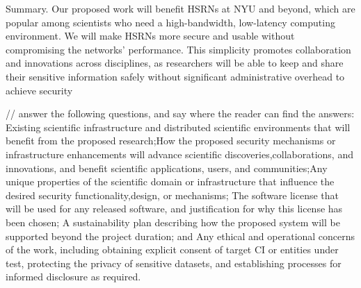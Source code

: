 Summary. Our proposed work will benefit HSRNs at NYU and beyond, which are popular among scientists who need a high-bandwidth, low-latency computing environment. We will make HSRNs more secure and usable without compromising the networks’ performance. This simplicity promotes collaboration and innovations across disciplines, as researchers will be able to keep and share their sensitive information safely without significant administrative overhead to achieve security

// answer the following questions, and say where the reader can find the answers: Existing scientific infrastructure and distributed scientific environments that will benefit from the proposed research;How the proposed security mechanisms or infrastructure enhancements will advance scientific discoveries,collaborations, and innovations, and benefit scientific applications, users, and communities;Any unique properties of the scientific domain or infrastructure that influence the desired security functionality,design, or mechanisms; The software license that will be used for any released software, and justification for why this license has been chosen; A sustainability plan describing how the proposed system will be supported beyond the project duration; and Any ethical and operational concerns of the work, including obtaining explicit consent of target CI or entities under test, protecting the privacy of sensitive datasets, and establishing processes for informed disclosure as required.

